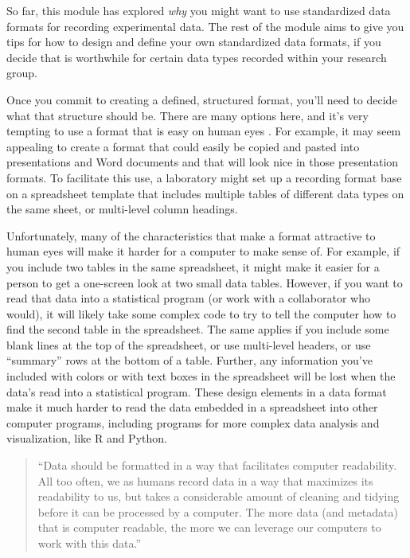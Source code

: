 \documentclass[]{tufte-book}
\begin{document}
So far, this module has explored \emph{why} you might want to use standardized
data formats for recording experimental data. The rest of the module
aims to give you tips for how to design and define your own standardized
data formats, if you decide that is worthwhile for certain data types
recorded within your research group.

Once you commit to creating a defined, structured format, you'll need to decide
what that structure should be. There are many options here, and it's very
tempting to use a format that is easy on human eyes
\citep{buffalo2015bioinformatics}. For example, it may seem appealing to create a
format that could easily be copied and pasted into presentations and Word
documents and that will look nice in those presentation formats. To facilitate
this use, a laboratory might set up a recording format base on a spreadsheet
template that includes multiple tables of different data types on the same
sheet, or multi-level column headings.

Unfortunately, many of the characteristics that make a format attractive
to human eyes will make it harder for a computer to make sense of. For example,
if you include two tables in the same spreadsheet, it might make it easier for a
person to get a one-screen look at two small data tables. However, if you want
to read that data into a statistical program (or work with a collaborator who
would), it will likely take some complex code to try to tell the computer how to
find the second table in the spreadsheet. The same applies if you include some
blank lines at the top of the spreadsheet, or use multi-level headers, or use
``summary'' rows at the bottom of a table. Further, any information you've
included with colors or with text boxes in the spreadsheet will be lost when the
data's read into a statistical program. These design elements in a data
format make it much harder to read the data embedded in a spreadsheet into other
computer programs, including programs for more complex data analysis and
visualization, like R and Python.

\begin{quote}
``Data should be formatted in a way that facilitates computer readability. All
too often, we as humans record data in a way that maximizes its readability to
us, but takes a considerable amount of cleaning and tidying before it can be
processed by a computer. The more data (and metadata) that is computer readable,
the more we can leverage our computers to work with this data.''
\citep{buffalo2015bioinformatics}
\end{quote}
\end{document}
